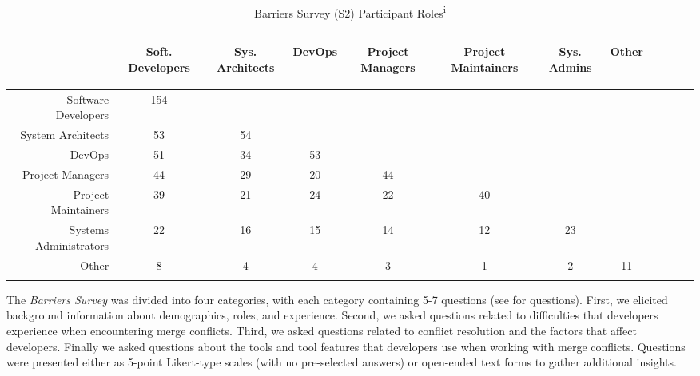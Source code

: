 \begin{table}[!htbp]
\caption{Barriers Survey (S2) Participant Roles\textsuperscript{i}}
\label{survey_roles}
\centering
\begin{tabularx}{\textwidth}{@{}r|*{10}{C}c@{}}
\toprule
\addlinespace[4.5em]
	& \begin{rotate}{30} Soft. Developers \end{rotate} 
	& \begin{rotate}{30} Sys. Architects \end{rotate} 
	& \begin{rotate}{30} DevOps \end{rotate} 
	& \begin{rotate}{30} Project Managers \end{rotate}
	& \begin{rotate}{30} Project Maintainers \end{rotate}
	& \begin{rotate}{30} Sys. Admins \end{rotate}
	& \begin{rotate}{30} Other \end{rotate}\\
\midrule
	Software Developers & 154 & & & & & & \\
	System Architects & 53 & 54 & & & & & \\
	DevOps & 51 & 34 & 53 & & & & \\
	Project Managers & 44 & 29 & 20 & 44 & & & \\
	Project Maintainers & 39 & 21 & 24 & 22 & 40 & & \\
	Systems Administrators & 22 & 16 & 15 & 14 & 12 & 23 & \\
	Other & 8 & 4 & 4 & 3 & 1 & 2 & 11 \\
\bottomrule
\end{tabularx}
\end{table}

The \textit{Barriers Survey} was divided into four categories, with each category containing 5-7 questions (see \cite{companion_site} for questions).
First, we elicited background information about demographics, roles, and experience.
Second, we asked questions related to difficulties that developers experience when encountering merge conflicts.
Third, we asked questions related to conflict resolution and the factors that affect developers.
Finally we asked questions about the tools and tool features that developers use when working with merge conflicts.
Questions were presented either as 5-point Likert-type scales (with no pre-selected answers) or open-ended text forms to gather additional insights.

